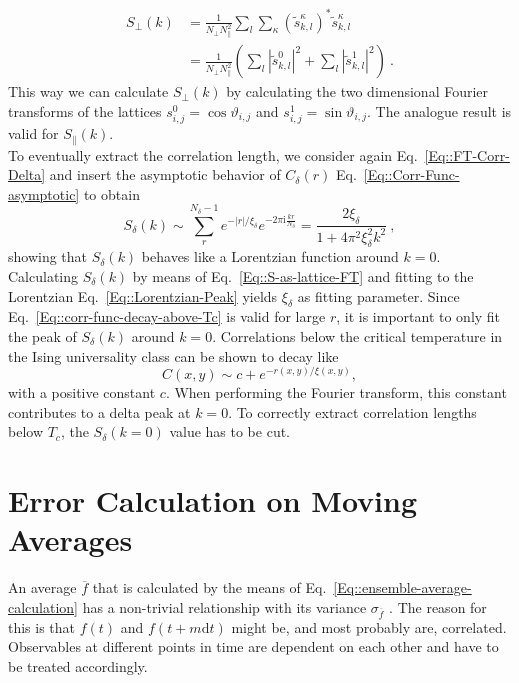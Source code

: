 	\begin{equation} \label{Eq::S-as-lattice-FT}
		\begin{split}
			S_\perp(k) &=	\frac{1}{N_\perp N_\parallel^2} \sum_l \sum_\kappa \left(\tilde{s}_{k,l}^\kappa\right)^* \tilde{s}_{k,l}^\kappa \\
			&= \frac{1}{N_\perp N_\parallel^2} \left( \sum_l |\tilde{s}_{k,l}^0|^2  + \sum_l |\tilde{s}_{k,l}^1|^2\right)~.
		\end{split}
	\end{equation}
	This way we can calculate $S_\perp(k)$ by calculating the two dimensional Fourier transforms of the lattices $s_{i,j}^0 = \cos \vartheta_{i,j}	$ and $s_{i,j}^1 =	\sin \vartheta_{i,j}$.
	The analogue result is valid for $S_\parallel(k)$. \\
	
	To eventually extract the correlation length, we consider again Eq.~\eqref{Eq::FT-Corr-Delta} and insert the asymptotic behavior of $C_\delta (r)$  Eq.~\eqref{Eq::Corr-Func-asymptotic} to obtain
	\begin{equation} \label{Eq::Lorentzian-Peak}
		S_\delta(k) \sim \sum_r^{N_\delta - 1} e^{-|r| /	\xi_\delta} e^{-2\pi \mathrm{i} \frac{kr}{N_\delta}} = \frac{2 \xi_\delta}{1 + 4 \pi^2 \xi_\delta^2 k^2}	~,
	\end{equation}
	showing that $S_\delta(k)$ behaves like a Lorentzian function around $k=0$. Calculating $S_\delta(k)$ by means of Eq.~\eqref{Eq::S-as-lattice-FT} and fitting to the Lorentzian Eq.~\eqref{Eq::Lorentzian-Peak} yields $\xi_\delta$ as fitting parameter. Since Eq.~\eqref{Eq::corr-func-decay-above-Tc} is valid for large $r$, it is important to only fit the peak of $S_\delta(k)$ around $k = 0$. Correlations below the critical temperature in the Ising universality class can be shown \cite{mccoy1973two} to decay like
	\begin{equation}
		C(x, y) \sim  c + e^{-r(x,y) /	\xi(x,y)},
	\end{equation}
	with a positive constant $c$. When performing the Fourier transform, this constant contributes to a delta peak at $k = 0$. To correctly extract correlation lengths below $T_c$, the $S_\delta(k =	0)$ value has to be cut.	
	\section{Error Calculation on Moving Averages} \label{Section::Error-Calc}	
	An average $\overline{f}$ that is calculated by the means of Eq.~\eqref{Eq::ensemble-average-calculation} has a non-trivial relationship with its variance $\sigma_{\overline{f}}$ \cite{madras1988pivot}. The reason for this is that $f(t)$ and $f(t + m\text{d}t)$ might be, and most probably are, correlated. Observables at different points in time are dependent on each other  and have to be treated accordingly. \\
	
